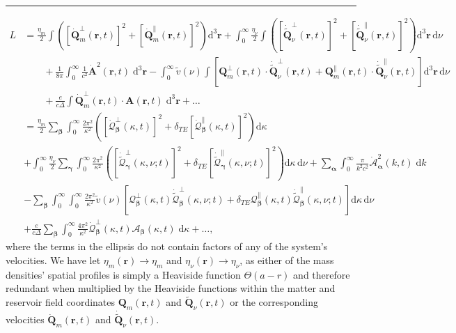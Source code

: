 \documentclass{article}
\begin{document}
\noindent\rule{\textwidth}{0.5pt}

\begin{equation}
\begin{split}
L &= \frac{\eta_m}{2}\int\left(\left[\dot{\mathbf{Q}}_m^\perp(\mathbf{r},t)\right]^2 + \left[\dot{\mathbf{Q}}_m^\parallel(\mathbf{r},t)\right]^2\right)\mathrm{d}^3\mathbf{r} + \int_0^\infty\frac{\eta_\nu}{2}\int\left(\left[\dot{\tilde{\mathbf{Q}}}_\nu^\perp(\mathbf{r},t)\right]^2 + \left[\dot{\tilde{\mathbf{Q}}}_\nu^\parallel(\mathbf{r},t)\right]^2\right)\mathrm{d}^3\mathbf{r}\,\mathrm{d}\nu\\
&\qquad + \frac{1}{8\pi}\int_0^\infty\frac{1}{c^2}\dot{\mathbf{A}}^2(\mathbf{r},t)\;\mathrm{d}^3\mathbf{r} - \int_0^\infty\tilde{v}(\nu)\int\left[\mathbf{Q}_m^\perp(\mathbf{r},t)\cdot\dot{\tilde{\mathbf{Q}}}_\nu^\perp(\mathbf{r},t) + \mathbf{Q}_m^\parallel(\mathbf{r},t)\cdot\dot{\tilde{\mathbf{Q}}}_\nu^\parallel(\mathbf{r},t)\right]\mathrm{d}^3\mathbf{r}\,\mathrm{d}\nu\\
&\qquad + \frac{e}{c\Delta}\int\dot{\mathbf{Q}}_m^\perp(\mathbf{r},t)\cdot\mathbf{A}(\mathbf{r},t)\;\mathrm{d}^3\mathbf{r} + \ldots\\
&= \frac{\eta_m}{2}\sum_{\bm{\beta}}\int_0^\infty\frac{2\pi^2}{\kappa^2}\left(\left[\dot{\mathcal{Q}}_{\bm{\beta}}^\perp(\kappa,t)\right]^2 + \delta_{TE}\left[\dot{\mathcal{Q}}_{\bm{\beta}}^\parallel(\kappa,t)\right]^2\right)\mathrm{d}\kappa\\
&+ \int_0^\infty\frac{\eta_\nu}{2}\sum_{\bm{\gamma}}\int_0^\infty\frac{2\pi^2}{\kappa^2}\left(\left[\dot{\tilde{\mathcal{Q}}}_{\bm{\gamma}}^\perp(\kappa,\nu;t)\right]^2 + \delta_{TE}\left[\dot{\tilde{\mathcal{Q}}}_{\bm{\gamma}}^\parallel(\kappa,\nu;t)\right]^2\right)\mathrm{d}\kappa\,\mathrm{d}\nu + \sum_{\bm{\alpha}}\int_{0}^\infty\frac{\pi}{k^2c^2}\dot{\mathcal{A}}_{\bm{\alpha}}^2(k,t)\;\mathrm{d}k\\
&- \sum_{\bm{\beta}}\int_0^\infty\int_0^\infty\frac{2\pi^2}{\kappa^2}\tilde{v}(\nu)\left[\mathcal{Q}_{\bm{\beta}}^\perp(\kappa,t)\dot{\tilde{\mathcal{Q}}}_{\bm{\beta}}^\perp(\kappa,\nu;t) + \delta_{TE}\mathcal{Q}_{\bm{\beta}}^\parallel(\kappa,t)\dot{\tilde{\mathcal{Q}}}_{\bm{\beta}}^\parallel(\kappa,\nu;t)\right]\mathrm{d}\kappa\,\mathrm{d}\nu\\
&+ \frac{e}{c\Delta}\sum_{\bm{\beta}}\int_0^\infty\frac{4\pi^2}{\kappa^2}\dot{\mathcal{Q}}_{\bm{\beta}}^\perp(\kappa,t)\mathcal{A}_{\bm{\beta}}(\kappa,t)\;\mathrm{d}\kappa + \ldots,
\end{split}
\end{equation}
where the terms in the ellipsis do not contain factors of any of the system's velocities. We have let $\eta_m(\mathbf{r})\to\eta_m$ and $\eta_\nu(\mathbf{r})\to\eta_\nu$, as either of the mass densities' spatial profiles is simply a Heaviside function $\Theta(a - r)$ and therefore redundant when multiplied by the Heaviside functions within the matter and reservoir field coordinates $\mathbf{Q}_m(\mathbf{r},t)$ and $\tilde{\mathbf{Q}}_\nu(\mathbf{r},t)$ or the corresponding velocities $\dot{\mathbf{Q}}_m(\mathbf{r},t)$ and $\dot{\tilde{\mathbf{Q}}}_\nu(\mathbf{r},t)$.
\end{document}
